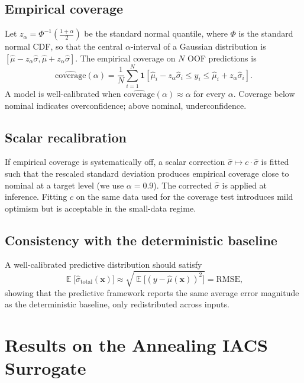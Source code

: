 \documentclass[conference]{IEEEtran}
\DeclareMathOperator{\E}{\mathbb{E}}
\begin{document}
\subsection{Empirical coverage}

Let $z_\alpha = \Phi^{-1}(\tfrac{1+\alpha}{2})$ be the standard normal quantile, where $\Phi$ is the standard normal CDF, so that the central $\alpha$-interval of a Gaussian distribution is $[\hat\mu - z_\alpha \hat\sigma, \hat\mu + z_\alpha \hat\sigma]$. The empirical coverage on $N$ OOF predictions is
\begin{equation}
\widehat{\text{coverage}}(\alpha) = \frac{1}{N}\sum_{i=1}^N \mathbf{1}\!\left[\hat\mu_i - z_\alpha \hat\sigma_i \leq y_i \leq \hat\mu_i + z_\alpha \hat\sigma_i\right].
\label{eq:emp-coverage}
\end{equation}
A model is well-calibrated when $\widehat{\text{coverage}}(\alpha) \approx \alpha$ for every $\alpha$. Coverage below nominal indicates overconfidence; above nominal, underconfidence.

\subsection{Scalar recalibration}

If empirical coverage is systematically off, a scalar correction $\hat\sigma \mapsto c \cdot \hat\sigma$ is fitted such that the rescaled standard deviation produces empirical coverage close to nominal at a target level (we use $\alpha = 0.9$). The corrected $\hat\sigma$ is applied at inference. Fitting $c$ on the same data used for the coverage test introduces mild optimism but is acceptable in the small-data regime.

\subsection{Consistency with the deterministic baseline}

A well-calibrated predictive distribution should satisfy
\begin{equation}
\E\!\big[\hat\sigma_{\text{total}}(\bm x)\big] \approx \sqrt{\E\!\big[(y - \hat\mu(\bm x))^2\big]} = \text{RMSE},
\label{eq:consistency}
\end{equation}
showing that the predictive framework reports the same average error magnitude as the deterministic baseline, only redistributed across inputs.

\section{Results on the Annealing IACS Surrogate}
\label{sec:results}
\end{document}

